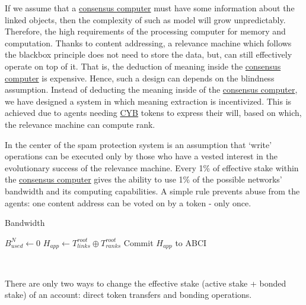 \documentclass[8pt,oneside]{amsart}
\begin{document}
If we assume that a {\hyperref[consensus-computer]{consensus computer}} must have some information about the linked objects, then the complexity of such as model will grow unpredictably. Therefore, the high requirements of the processing computer for memory and computation. Thanks to content addressing, a relevance machine which follows the blackbox principle does not need to store the data, but, can still effectively operate on top of it. That is, the deduction of meaning inside the {\hyperref[consensus-computer]{consensus computer}} is expensive. Hence, such a design can depends on the blindness assumption. Instead of deducting the meaning inside of the {\hyperref[consensus-computer]{consensus computer}}, we have designed a system in which meaning extraction is incentivized. This is achieved due to agents needing {\hyperref[cyb]{CYB}} tokens to express their will, based on which, the relevance machine can compute rank.

In the center of the spam protection system is an assumption that ‘write’ operations can be executed only by those who have a vested interest in the evolutionary success of the relevance machine. Every 1\% of effective stake within the {\hyperref[consensus-computer]{consensus computer}} gives the ability to use 1\% of the possible networks' bandwidth and its computing capabilities. A simple rule prevents abuse from the agents: one content address can be voted on by a token - only once.

\begin{algorithm}
\caption{Bandwidth}\label{bandwidth-algo}
$B^{N}_{used} \leftarrow 0$\;
\BlankLine
$H_{app} \leftarrow T^{root}_{links} \oplus T^{root}_{ranks}$\;
Commit $H_{app}$ to ABCI\;
\end{algorithm}\

There are only two ways to change the effective stake (active stake + bonded stake) of an account: direct token transfers and bonding operations.
\end{document}
